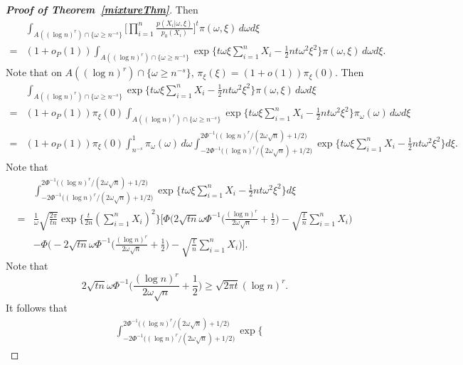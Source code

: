 \documentclass[11pt]{article}
\theoremstyle{plain}
\theoremstyle{definition}
\theoremstyle{remark}
\begin{document}
\begin{appendices}
\begin{proof}[\textbf{Proof of Theorem~\ref{mixtureThm}}]
Then
\begin{align*}
    & \int_{A((\log n)^r)\cap \{\omega\geq n^{-s}\}} \Big[\prod_{i=1}^n \frac{p(X_i|\omega,\xi)}{p_0(X_i)}\Big]^t \pi(\omega,\xi)\, d\omega d\xi
    \\
    =&(1+o_P(1))\int_{A( (\log n)^r )\cap \{\omega\geq  n^{-s}\} } \exp\big\{
        t\omega \xi \sum_{i=1}^n X_i -\frac{1}{2} nt\omega^2 \xi^2
    \big\} \pi(\omega,\xi)\, d\omega d\xi.
\end{align*}
Note that on $A((\log n)^r)\cap \{\omega\geq n^{-s}\}$, $\pi_{\xi}(\xi)=(1+o(1))\pi_\xi(0)$. Then
\begin{align*}
    &\int_{A((\log n)^r)\cap \{\omega\geq n^{-s}\} } \exp\big\{
        t\omega \xi \sum_{i=1}^n X_i -\frac{1}{2} nt\omega^2 \xi^2
    \big\} \pi(\omega,\xi)\, d\omega d\xi
    \\
    =&(1+o_P(1))\pi_{\xi}(0)\int_{A((\log n)^r)\cap \{\omega\geq  n^{-s}\} } \exp\big\{
        t\omega \xi \sum_{i=1}^n X_i -\frac{1}{2} nt\omega^2 \xi^2
    \big\} \pi_{\omega}(\omega)\, d\omega d\xi
    \\
    =&(1+o_P(1))\pi_{\xi}(0)\int_{n^{-s}}^1 \pi_{\omega}(\omega)\, d\omega 
    \int_{-2\Phi^{-1}\big((\log n)^r/(2\omega \sqrt{n})+1/2\big)}^{2\Phi^{-1}\big((\log n)^r/(2\omega \sqrt{n})+1/2\big)} \exp\big\{
        t\omega \xi \sum_{i=1}^n X_i -\frac{1}{2} nt\omega^2 \xi^2
    \big\} d\xi.
\end{align*}
Note that
\begin{align*}
    &\int_{-2\Phi^{-1}\big((\log n)^r/(2\omega \sqrt{n})+1/2\big)}^{2\Phi^{-1}\big((\log n)^r/(2\omega \sqrt{n})+1/2\big)} \exp\big\{
        t\omega \xi \sum_{i=1}^n X_i -\frac{1}{2} nt\omega^2 \xi^2
\big\} d\xi
\\
=&
 \frac{1}{\omega} \sqrt{\frac{2\pi}{tn}}  \exp\Big\{\frac{t}{2n}(\sum_{i=1}^n X_i)^2\Big\}
\bigg[
    \Phi\bigg(2\sqrt{tn}\omega \Phi^{-1}\Big(\frac{(\log n)^r}{2\omega\sqrt{n}}+\frac 12\Big)-\sqrt{\frac t n} \sum_{i=1}^n X_i\bigg)
    \\
    &
    -
    \Phi\bigg(-2\sqrt{tn}\omega \Phi^{-1}\Big(\frac{(\log n)^r}{2\omega\sqrt{n}}+\frac 12\Big)-\sqrt{\frac t n} \sum_{i=1}^n X_i\bigg)
\bigg].
\end{align*}
Note that 
\begin{equation*}
    2\sqrt{tn}\omega \Phi^{-1}\Big(\frac{(\log n)^r}{2\omega\sqrt{n}}+\frac 12\Big)
    \geq 
    \sqrt{2\pi t} (\log n)^r.
\end{equation*}
It follows that
\begin{align*}
    &\int_{-2\Phi^{-1}\big((\log n)^r/(2\omega \sqrt{n})+1/2\big)}^{2\Phi^{-1}\big((\log n)^r/(2\omega \sqrt{n})+1/2\big)} \exp\big\{

\end{align*}
\end{proof}
\end{appendices}
\end{document}
